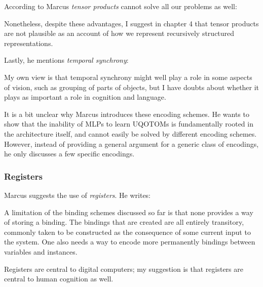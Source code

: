 \documentclass[../../main.tex]{subfiles}
\begin{document}
According to Marcus \emph{tensor products} cannot solve all our problems as well:

\begin{citecallout}
    Nonetheless, despite these advantages, I suggest in chapter 4
    that tensor products are not plausible as an account of how we represent
    recursively structured representations.
\end{citecallout}

Lastly, he mentions \emph{temporal synchrony}:

\begin{citecallout}
    My own view is that temporal synchrony might well play a role in
    some aspects of vision, such as grouping of parts of objects, but I have
    doubts about whether it plays as important a role in cognition and language.
\end{citecallout}

\begin{critique}
    It is a bit unclear why Marcus introduces these encoding schemes. He wants to show that the inability of MLPs to learn UQOTOMs is fundamentally rooted in the architecture itself, and cannot easily be solved by different encoding schemes. However, instead of providing a general argument for a generic class of encodings, he only discusses a few specific encodings.
\end{critique}

\subsubsection{Registers}
Marcus suggests the use of \emph{registers}. He writes:

\begin{citecallout}
    A limitation of the binding schemes discussed so far is that none provides a way of storing a binding. The bindings that are created are all entirely transitory, commonly taken to be constructed as the consequence
    of some current input to the system. One also needs a way to encode
    more permanently bindings between variables and instances.
\end{citecallout}

\begin{citecallout}
    Registers are central to digital computers; my suggestion is that registers are central to human cognition as well.
\end{citecallout}
\end{document}
